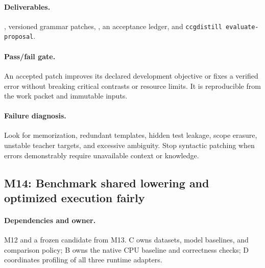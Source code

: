 \documentclass[11pt,a4paper]{article}
\begin{document}
\paragraph{Deliverables.} , versioned grammar patches, , an acceptance ledger, and \texttt{ccgdistill evaluate-proposal}.

\paragraph{Pass/fail gate.} An accepted patch improves its declared development objective or fixes a verified error without breaking critical contrasts or resource limits. It is reproducible from the work packet and immutable inputs.

\paragraph{Failure diagnosis.} Look for memorization, redundant templates, hidden test leakage, scope erasure, unstable teacher targets, and excessive ambiguity. Stop syntactic patching when errors demonstrably require unavailable context or knowledge.

\subsection{M14: Benchmark shared lowering and optimized execution fairly}

\paragraph{Dependencies and owner.} M12 and a frozen candidate from M13.
C owns datasets, model baselines, and comparison policy; B owns the native CPU
baseline and correctness checks; D coordinates profiling of all three
runtime adapters.
\end{document}
